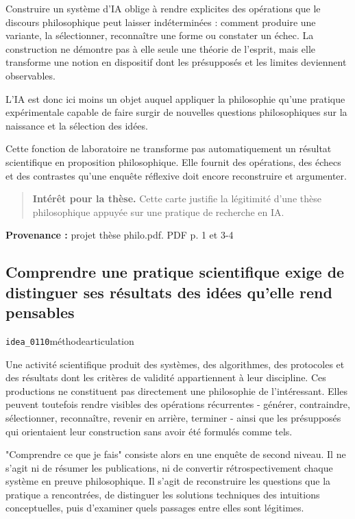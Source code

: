 \documentclass[10pt,a4paper]{article}
\begin{document}
Construire un système d'IA oblige à rendre explicites des opérations que le discours philosophique peut laisser indéterminées : comment produire une variante, la sélectionner, reconnaître une forme ou constater un échec. La construction ne démontre pas à elle seule une théorie de l'esprit, mais elle transforme une notion en dispositif dont les présupposés et les limites deviennent observables.

L'IA est donc ici moins un objet auquel appliquer la philosophie qu'une pratique expérimentale capable de faire surgir de nouvelles questions philosophiques sur la naissance et la sélection des idées.

Cette fonction de laboratoire ne transforme pas automatiquement un résultat scientifique en proposition philosophique. Elle fournit des opérations, des échecs et des contrastes qu'une enquête réflexive doit encore reconstruire et argumenter.

\begin{quote}
\textbf{Intérêt pour la thèse.} Cette carte justifie la légitimité d'une thèse philosophique appuyée sur une pratique de recherche en IA.
\end{quote}
{\footnotesize\color{metadata}\textbf{Provenance :} projet thèse philo.pdf. PDF p. 1 et 3-4\par}

\subsection{Comprendre une pratique scientifique exige de distinguer ses résultats des idées qu'elle rend pensables}
{\small\color{metadata} \texttt{idea\_0110}\quad\textbullet\quad méthode\quad\textbullet\quad articulation\par}

Une activité scientifique produit des systèmes, des algorithmes, des protocoles et des résultats dont les critères de validité appartiennent à leur discipline. Ces productions ne constituent pas directement une philosophie de l'intéressant. Elles peuvent toutefois rendre visibles des opérations récurrentes - générer, contraindre, sélectionner, reconnaître, revenir en arrière, terminer - ainsi que les présupposés qui orientaient leur construction sans avoir été formulés comme tels.

"Comprendre ce que je fais" consiste alors en une enquête de second niveau. Il ne s'agit ni de résumer les publications, ni de convertir rétrospectivement chaque système en preuve philosophique. Il s'agit de reconstruire les questions que la pratique a rencontrées, de distinguer les solutions techniques des intuitions conceptuelles, puis d'examiner quels passages entre elles sont légitimes.
\end{document}
